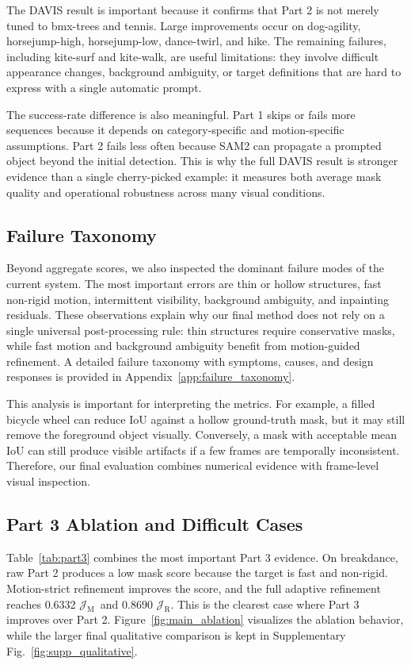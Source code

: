 \documentclass[10pt,twocolumn,letterpaper]{article}
\newcommand{\jm}{\ensuremath{\mathcal{J}_{\mathrm{M}}}}
\newcommand{\jr}{\ensuremath{\mathcal{J}_{\mathrm{R}}}}
\begin{document}
The DAVIS result is important because it confirms that Part 2 is not merely tuned to bmx-trees and tennis. Large improvements occur on dog-agility, horsejump-high, horsejump-low, dance-twirl, and hike. The remaining failures, including kite-surf and kite-walk, are useful limitations: they involve difficult appearance changes, background ambiguity, or target definitions that are hard to express with a single automatic prompt.

The success-rate difference is also meaningful. Part 1 skips or fails more sequences because it depends on category-specific and motion-specific assumptions. Part 2 fails less often because SAM2 can propagate a prompted object beyond the initial detection. This is why the full DAVIS result is stronger evidence than a single cherry-picked example: it measures both average mask quality and operational robustness across many visual conditions.

\subsection{Failure Taxonomy}
Beyond aggregate scores, we also inspected the dominant failure modes of the current system. The most important errors are thin or hollow structures, fast non-rigid motion, intermittent visibility, background ambiguity, and inpainting residuals. These observations explain why our final method does not rely on a single universal post-processing rule: thin structures require conservative masks, while fast motion and background ambiguity benefit from motion-guided refinement. A detailed failure taxonomy with symptoms, causes, and design responses is provided in Appendix~\ref{app:failure_taxonomy}.

This analysis is important for interpreting the metrics. For example, a filled bicycle wheel can reduce IoU against a hollow ground-truth mask, but it may still remove the foreground object visually. Conversely, a mask with acceptable mean IoU can still produce visible artifacts if a few frames are temporally inconsistent. Therefore, our final evaluation combines numerical evidence with frame-level visual inspection.
\subsection{Part 3 Ablation and Difficult Cases}
Table~\ref{tab:part3} combines the most important Part 3 evidence. On breakdance, raw Part 2 produces a low mask score because the target is fast and non-rigid. Motion-strict refinement improves the score, and the full adaptive refinement reaches 0.6332 \jm\ and 0.8690 \jr. This is the clearest case where Part 3 improves over Part 2. Figure~\ref{fig:main_ablation} visualizes the ablation behavior, while the larger final qualitative comparison is kept in Supplementary Fig.~\ref{fig:supp_qualitative}.
\end{document}
